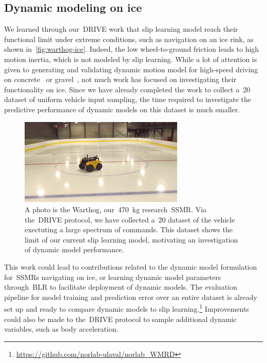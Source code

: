 \documentclass[12pt,letterpaper,oneside]{article}
\begin{document}
\subsection{Dynamic modeling on ice}
We learned through our~\ac{DRIVE} work that slip learning model reach their functional limit under extreme conditions, such as navigation on an ice rink, as shown in~\autoref{fig:warthog-ice}.
Indeed, the low wheel-to-ground friction leads to high motion inertia, which is not modeled by slip learning.
While a lot of attention is given to generating and validating dynamic motion model for high-speed driving on concrete~\citep{Djeumou2023} or gravel~\citep{Williams2018}, not much work has focused on investigating their functionality on ice.
Since we have already completed the work to collect a~\SI{20}{\min} dataset of uniform vehicle input sampling, the time required to investigate the predictive performance of dynamic models on this dataset is much smaller.
\begin{figure}
	\centering
	\includegraphics[width=0.7\textwidth]{figs/warthog_ice.png}
	\caption{
		A photo is the Warthog, our~\SI{470}{\kilo\gram} research~\ac{SSMR}.
		Via the~\ac{DRIVE} protocol, we have collected a~\SI{20}{\min} dataset of the vehicle exectuting a large spectrum of commands.
		This dataset shows the limit of our current slip learning model, motivating an investigation of dynamic model performance.
	}
	\label{fig:warthog-ice}
\end{figure}

This work could lead to contributions related to the dynamic model formulation for~\acp{SSMR} navigating on ice, or learning dynamic model parameters through~\ac{BLR} to facilitate deployment of dynamic models.
The evaluation pipeline for model training and prediction error over an entire dataset is already set up and ready to compare dynamic models to slip learning.\footnote{\url{https://github.com/norlab-ulaval/norlab_WMRD}}
Improvements could also be made to the~\ac{DRIVE} protocol to sample additional dynamic variables, such as body acceleration. %
\end{document}
